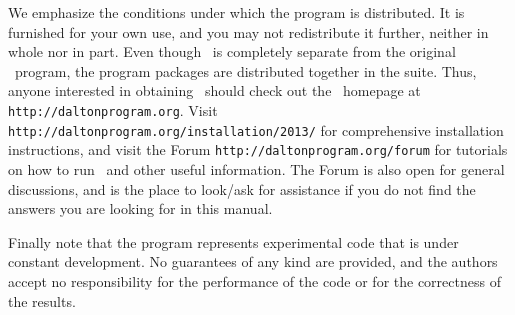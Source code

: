 \vspace{0.5 cm}

We emphasize the conditions under which the
program is distributed.  It is furnished for your own use,
and you may not redistribute it further, neither in whole nor in
part.  Even though \lsdalton\ is completely separate from the original
\dalton\ program, the program packages are distributed together in the
{\latestrelease} suite. Thus, 
anyone interested in obtaining \lsdalton\ should check out the
\dalton\ homepage at
\verb|http://daltonprogram.org|. Visit \verb|http://daltonprogram.org/installation/2013/|
for comprehensive installation instructions, and visit the Forum
\verb|http://daltonprogram.org/forum| for 
tutorials on how to run \lsdalton\ and other 
useful information. The Forum is also open for general discussions, and 
is the place to look/ask for assistance if you do not find the answers 
you are looking for in this manual.

Finally note that the
program represents experimental code that is
under constant development.  No guarantees of any kind are
provided, and the authors accept no responsibility for the
performance of the code or for the correctness of the results.

